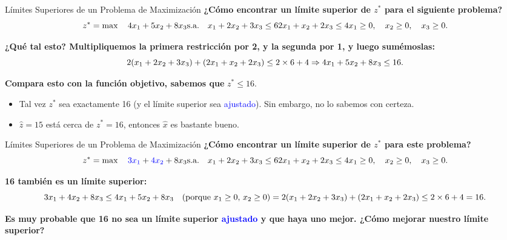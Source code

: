 \documentclass{beamer}
\begin{document}
\begin{frame}{Límites Superiores de un Problema de Maximización}
    \textbf{¿Cómo encontrar un límite superior de \( z^* \) para el siguiente problema?}
    \[
    z^* = \max \quad 4x_1 + 5x_2 + 8x_3 \\
    \text{s.a.} \quad x_1 + 2x_2 + 3x_3 \leq 6 \\
    2x_1 + x_2 + 2x_3 \leq 4 \\
    x_1 \geq 0, \quad x_2 \geq 0, \quad x_3 \geq 0.
    \]
    
    \vspace{0.3cm}
    \textbf{¿Qué tal esto? Multipliquemos la primera restricción por 2, y la segunda por 1, y luego sumémoslas:}
    \[
    2(x_1 + 2x_2 + 3x_3) + (2x_1 + x_2 + 2x_3) \leq 2 \times 6 + 4 \\
    \Rightarrow 4x_1 + 5x_2 + 8x_3 \leq 16.
    \]

    \vspace{0.3cm}
    \textbf{Compara esto con la función objetivo, sabemos que} \( z^* \leq 16 \).
    \begin{itemize}
        \item Tal vez \( z^* \) sea exactamente 16 (y el límite superior sea \textcolor{blue}{ajustado}). Sin embargo, no lo sabemos con certeza.
        \item \(\hat{z} = 15\) está cerca de \( z^* = 16 \), entonces \(\hat{x}\) es bastante bueno.
    \end{itemize}
\end{frame}

\begin{frame}{Límites Superiores de un Problema de Maximización}
    \textbf{¿Cómo encontrar un límite superior de \( z^* \) para este problema?}
    \[
    z^* = \max \quad \textcolor{blue}{3x_1} + \textcolor{blue}{4x_2} + 8x_3 \\
    \text{s.a.} \quad x_1 + 2x_2 + 3x_3 \leq 6 \\
    2x_1 + x_2 + 2x_3 \leq 4 \\
    x_1 \geq 0, \quad x_2 \geq 0, \quad x_3 \geq 0.
    \]

    \vspace{0.3cm}
    \textbf{16 también es un límite superior:}
    \[
    3x_1 + 4x_2 + 8x_3 \\
    \leq 4x_1 + 5x_2 + 8x_3 \quad \text{(porque \( x_1 \geq 0, \, x_2 \geq 0 \))} \\
    = 2(x_1 + 2x_2 + 3x_3) + (2x_1 + x_2 + 2x_3) \\
    \leq 2 \times 6 + 4 = 16.
    \]

    \vspace{0.3cm}
    \textbf{Es muy probable que 16 no sea un límite superior \textcolor{blue}{ajustado} y que haya uno mejor. ¿Cómo mejorar nuestro límite superior?}
\end{frame}
\end{document}

